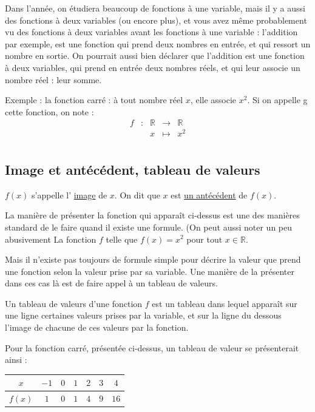 \documentclass[10pt,a4paper,oneside]{book}
\newcommand{\R}{\mathbb{R}}
\begin{document}
Dans l'année, on étudiera beaucoup de fonctions à une variable, mais il y a aussi des fonctions à deux variables (ou encore plus), et vous avez même probablement vu des fonctions à deux variables avant les fonctions à une variable : l'addition par exemple, est une fonction qui prend deux nombres en entrée, et qui ressort un nombre en sortie. On pourrait aussi bien déclarer que l'addition est une fonction à deux variables, qui prend en entrée deux nombres réels, et qui leur associe un nombre réel : leur somme.



Exemple :  la fonction carré : à tout nombre réel $x$, elle associe $x^2$. Si on appelle g cette fonction, on note :
\[
\begin{array}{ccccc}
f & : & \R & \to & \R \\
 & & x & \mapsto & x^2 \\
\end{array}
\]


\subsection{Image et antécédent, tableau de valeurs}

\begin{de}
        $f(x)$ s'appelle l' \underline{image} de $x$. On dit que $x$ est \underline{un antécédent} de $f(x)$.
\end{de}

La manière de présenter la fonction qui apparaît ci-dessus est une des manières standard de le faire quand il existe une formule. (On peut aussi noter un peu abusivement La fonction $f$ telle que $f(x)=x^2$ pour tout $x\in \R$.

Mais il n'existe pas toujours de formule simple pour décrire la valeur que prend une fonction selon la valeur prise par sa variable. Une manière de la présenter dans ces cas là est de faire appel à un tableau de valeurs.

\begin{de}
    Un tableau de valeurs d'une fonction $f$ est un tableau dans lequel apparaît sur une ligne certaines valeurs prises par la variable, et sur la ligne du dessous l'image de chacune de ces valeurs par la fonction.
\end{de}

Pour la fonction carré, présentée ci-dessus, un tableau de valeur se présenterait ainsi :

\begin{center}
    \begin{tabular}{|c|c|c|c|c|c|c|}
    \hline
         $x$ & $-1$ & $0$ & $1$ & $2$&$3$ & $4$ \\
    \hline
         $f(x)$ & $1$ & $0$ &$1$&$4$&$9$&$16$ \\
    \hline
    \end{tabular}
\end{center}
\end{document}
